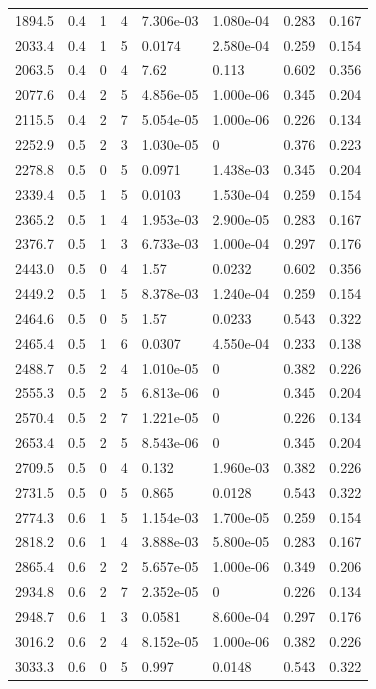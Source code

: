 \documentclass[preview]{standalone}
\begin{document}
{{{\begin{tabular}{L{1.2cm}C{1.2cm} C{0.3cm}C{0.5cm} C{1.4cm}C{1.4cm} C{1.4cm}C{1.4cm}}
  1894.5  &   0.4  & 1     &  4 &  7.306e-03  & 1.080e-04  & 0.283 &  0.167   \\ 
  2033.4  &   0.4  & 1     &  5 &  0.0174  & 2.580e-04  & 0.259 &  0.154   \\ 
  2063.5  &   0.4  & 0     &  4 &  7.62  & 0.113  & 0.602 &  0.356   \\ 
  2077.6  &   0.4  & 2     &  5 &  4.856e-05  & 1.000e-06  & 0.345 &  0.204   \\ 
  2115.5  &   0.4  & 2     &  7 &  5.054e-05  & 1.000e-06  & 0.226 &  0.134   \\ 
  2252.9  &   0.5  & 2     &  3 &  1.030e-05  & 0  & 0.376 &  0.223   \\ 
  2278.8  &   0.5  & 0     &  5 &  0.0971  & 1.438e-03  & 0.345 &  0.204   \\ 
  2339.4  &   0.5  & 1     &  5 &  0.0103  & 1.530e-04  & 0.259 &  0.154   \\ 
  2365.2  &   0.5  & 1     &  4 &  1.953e-03  & 2.900e-05  & 0.283 &  0.167   \\ 
  2376.7  &   0.5  & 1     &  3 &  6.733e-03  & 1.000e-04  & 0.297 &  0.176   \\ 
  2443.0  &   0.5  & 0     &  4 &  1.57  & 0.0232  & 0.602 &  0.356   \\ 
  2449.2  &   0.5  & 1     &  5 &  8.378e-03  & 1.240e-04  & 0.259 &  0.154   \\ 
  2464.6  &   0.5  & 0     &  5 &  1.57  & 0.0233  & 0.543 &  0.322   \\ 
  2465.4  &   0.5  & 1     &  6 &  0.0307  & 4.550e-04  & 0.233 &  0.138   \\ 
  2488.7  &   0.5  & 2     &  4 &  1.010e-05  & 0  & 0.382 &  0.226   \\ 
  2555.3  &   0.5  & 2     &  5 &  6.813e-06  & 0  & 0.345 &  0.204   \\ 
  2570.4  &   0.5  & 2     &  7 &  1.221e-05  & 0  & 0.226 &  0.134   \\ 
  2653.4  &   0.5  & 2     &  5 &  8.543e-06  & 0  & 0.345 &  0.204   \\ 
  2709.5  &   0.5  & 0     &  4 &  0.132  & 1.960e-03  & 0.382 &  0.226   \\ 
  2731.5  &   0.5  & 0     &  5 &  0.865  & 0.0128  & 0.543 &  0.322   \\ 
  2774.3  &   0.6  & 1     &  5 &  1.154e-03  & 1.700e-05  & 0.259 &  0.154   \\ 
  2818.2  &   0.6  & 1     &  4 &  3.888e-03  & 5.800e-05  & 0.283 &  0.167   \\ 
  2865.4  &   0.6  & 2     &  2 &  5.657e-05  & 1.000e-06  & 0.349 &  0.206   \\ 
  2934.8  &   0.6  & 2     &  7 &  2.352e-05  & 0  & 0.226 &  0.134   \\ 
  2948.7  &   0.6  & 1     &  3 &  0.0581  & 8.600e-04  & 0.297 &  0.176   \\ 
  3016.2  &   0.6  & 2     &  4 &  8.152e-05  & 1.000e-06  & 0.382 &  0.226   \\ 
  3033.3  &   0.6  & 0     &  5 &  0.997  & 0.0148  & 0.543 &  0.322   \\ 
\hline 
\end{tabular} 

}}}
\end{document}
